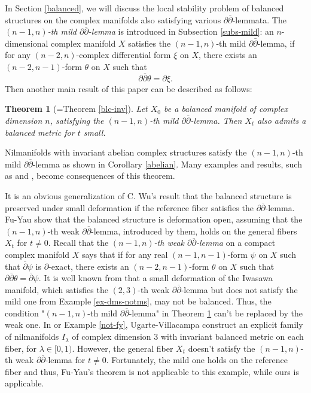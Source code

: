 \documentclass[12pt]{amsart}
\numberwithin{equation}{section}
\newtheorem{theorem} {Theorem} [section]
\renewcommand{\1}{\mathds{1}}
\newcommand{\db}{\overline{\partial}}
\renewcommand{\>}{\rightarrow}
\newcommand{\p}{\partial}
\def\p{\partial}
\def\b{\bar}
\begin{document}
In Section \ref{balanced}, we will discuss the local stability
problem of balanced structures on the complex manifolds also satisfying
various $\p\db$-lemmata. The \emph{$(n-1,n)$-th mild
$\p\b{\p}$-lemma} is introduced in
Subsection \ref{subs-mild}: an $n$-dimensional complex manifold $X$
satisfies the $(n-1,n)$-th mild $\p\b{\p}$-lemma, if  for any
$(n-2,n)$-complex differential form $\xi$ on $X$, there exists an
$(n-2,n-1)$-form $\theta$ on $X$ such that
\[ \p \db \theta = \p \xi. \]
Then another main result of this paper can be described as follows:
\begin{theorem}[=Theorem \ref{blc-inv}]\label{0blc-inv}
Let $X_0$ be a balanced manifold of complex dimension $n$,
satisfying the $(n-1,n)$-th mild $\p\db$-lemma. Then $X_t$ also
admits a balanced metric for $t$ small.
\end{theorem}

Nilmanifolds with invariant abelian complex structures satisfy the $(n-1,n)$-th mild $\p\db$-lemma as shown in
Corollary \ref{abelian}.
Many examples and results, such as \cite[Proposition 4.4, Remark 4.6, Remark 4.7 and Example 4.10]{au}
and \cite[Corollary 8 and Corollary 9]{FY}, become consequences of this theorem.

It is an obvious generalization of C. Wu's result \cite[Theorem 5.13]{w} that
the balanced structure is preserved under small deformation if the
reference fiber satisfies the $\p\db$-lemma. Fu-Yau \cite[Theorem
6]{FY} show that the balanced structure is deformation open,
assuming that the $(n-1,n)$-th weak $\p\db$-lemma, introduced by them, holds on the
general fibers $X_t$ for $t \neq 0$. Recall that the \emph{$(n-1,n)$-th weak $\p\db$-lemma} on a compact complex manifold $X$  says that if for any real
$(n-1,n-1)$-form $\psi$ on $X$ such that $\db \psi$ is $\p$-exact,
there exists an $(n-2,n-1)$-form $\theta$ on $X$ such that $ \p \db
\theta = \db \psi. $ It is well known from \cite{ab} that a small deformation
of the Iwasawa manifold, which satisfies the $(2,3)$-th weak
$\p\db$-lemma but does not satisfy the mild one from Example
\ref{ex-dms-notms}, may not be balanced. Thus, the condition
"$(n-1,n)$-th mild $\p\db$-lemma" in Theorem \ref{0blc-inv} can't be replaced
by the weak one. In \cite[Example 3.7]{UV} or Example \ref{not-fy}, Ugarte-Villacampa construct an explicit family of nilmanifolds $I_{\lambda}$ of complex dimension $3$ with invariant balanced metric on each fiber, for $ \lambda \in [0,1)$. However, the general fiber $X_t$ doesn't satisfy the $(n-1,n)$-th weak $\p\db$-lemma for $t \neq 0$. Fortunately, the mild one holds on the reference fiber and thus, Fu-Yau's theorem is not applicable to this example, while ours is applicable.
\end{document}
